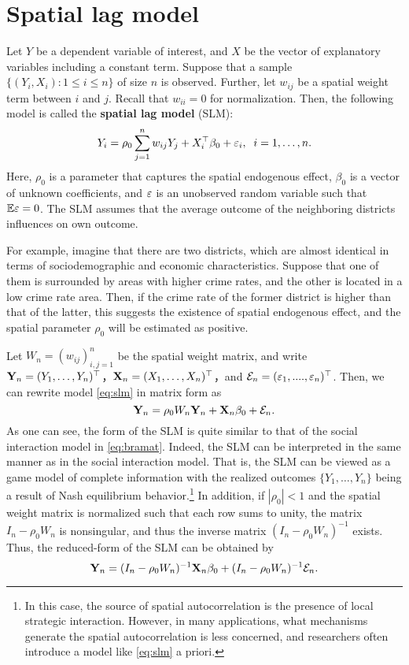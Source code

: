 \documentclass[11pt, A4paper, openany, uplatex]{book}
\begin{document}
\section{Spatial lag model}\label{sec:SLM}

Let $Y$ be a dependent variable of interest, and $X$ be the vector of explanatory variables including a constant term.
Suppose that a sample $\{(Y_i,X_i): 1 \le i \le n\}$ of size $n$ is observed.
Further, let $w_{ij}$ be a spatial weight term between $i$ and $j$.
Recall that $w_{ii} = 0$ for normalization.
Then, the following model is called the \textbf{spatial lag model} (SLM):
\begin{align}\label{eq:slm}
	Y_i = \rho_0 \sum_{j = 1}^n w_{ij} Y_j + X_i^\top\beta_0 + \varepsilon_i, \;\; i = 1,\ldots,n.
\end{align}
Here, $\rho_0$ is a parameter that captures the spatial endogenous effect, $\beta_0$ is a vector of unknown coefficients, and $\varepsilon$ is an unobserved random variable such that $\mathbb{E} \varepsilon = 0$.
The SLM assumes that the average outcome of the neighboring districts influences on own outcome.

For example, imagine that there are two districts, which are almost identical in terms of sociodemographic and economic characteristics.
Suppose that one of them is surrounded by areas with higher crime rates, and the other is  located in a low crime rate area.
Then, if the crime rate of the former district is higher than that of the latter, this suggests the existence of spatial endogenous effect, and the spatial parameter $\rho_0$ will be estimated as positive.

Let $W_n = (w_{ij})_{i,j = 1}^n$ be the spatial weight matrix, and write $\mathbf{Y}_n = (Y_1, \ldots, Y_n)^\top$，$\mathbf{X}_n = (X_1, \ldots , X_n)^\top$，and $\mathcal{E}_n = (\varepsilon_1, ...., \varepsilon_n)^\top$.
Then, we can rewrite model \eqref{eq:slm} in matrix form as
\[
	\mathbf{Y}_n =  \rho_0 W_n \mathbf{Y}_n + \mathbf{X}_n \beta_0 + \mathcal{E}_n.
\]
As one can see, the form of the SLM is quite similar to that of the social interaction model in \eqref{eq:bramat}.
Indeed, the SLM can be interpreted in the same manner as in the social interaction model.
That is, the SLM can be viewed as a game model of complete information with the realized outcomes $\{Y_1, \ldots, Y_n \}$ being a result of Nash equilibrium behavior.\footnote{
	In this case, the source of spatial autocorrelation is the presence of local strategic interaction.
	However, in many applications, what mechanisms generate the spatial autocorrelation is less concerned, and researchers often introduce a model like \eqref{eq:slm} a priori.
}
In addition, if $|\rho_0| < 1$ and the spatial weight matrix is normalized such that each row sums to unity, the matrix $I_n - \rho_0 W_n$ is nonsingular, and thus the inverse matrix 
$(I_n - \rho_0 W_n)^{-1}$ exists.
Thus, the reduced-form of the SLM can be obtained by
\[
	\mathbf{Y}_n =  (I_n - \rho_0 W_n)^{-1}\mathbf{X}_n \beta_0 + (I_n - \rho_0 W_n)^{-1}\mathcal{E}_n.
\]
\end{document}
